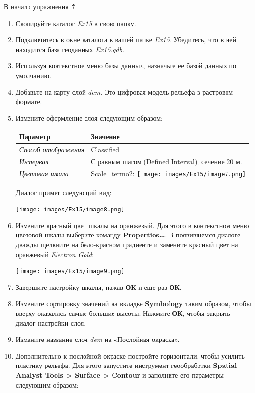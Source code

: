 \documentclass[12pt,]{book}
\begin{document}
\protect\hyperlink{dem}{В начало упражнения ⇡}

\begin{enumerate}
\def\labelenumi{\arabic{enumi}.}
\item
  Скопируйте каталог \emph{Ex15} в свою папку.
\item
  Подключитесь в окне каталога к вашей папке \emph{Ex15}. Убедитесь, что в ней находится база геоданных \emph{Ex15.gdb}.
\item
  Используя контекстное меню базы данных, назначьте ее базой данных по умолчанию.
\item
  Добавьте на карту слой \emph{dem}. Это цифровая модель рельефа в растровом формате.
\item
  Измените оформление слоя следующим образом:

  \begin{longtable}[]{@{}ll@{}}
  \toprule
  Параметр & Значение\tabularnewline
  \midrule
  \endhead
  \emph{Способ отображения} & Classified\tabularnewline
  \emph{Интервал} & С равным шагом (Defined Interval), сечение 20 м.\tabularnewline
  \emph{Цветовая шкала} & Scale\_termo2: \texttt{[image: images/Ex15/image7.png]}\tabularnewline
  \bottomrule
  \end{longtable}

  Диалог примет следующий вид:

  \texttt{[image: images/Ex15/image8.png]}
\item
  Измените красный цвет шкалы на оранжевый. Для этого в контекстном меню цветовой шкалы выберите команду \textbf{Properties\ldots{}}. В появившемся диалоге дважды щелкните на бело-красном градиенте и замените красный цвет на оранжевый \emph{Electron Gold}:

  \texttt{[image: images/Ex15/image9.png]}
\item
  Завершите настройку шкалы, нажав \textbf{ОК} и еще раз \textbf{ОК}.
\item
  Измените сортировку значений на вкладке \textbf{Symbology} таким образом, чтобы вверху оказались самые большие высоты. Нажмите \textbf{ОК}, чтобы закрыть диалог настройки слоя.
\item
  Измените название слоя \emph{dem} на «Послойная окраска».
\item
  Дополнительно к послойной окраске постройте горизонтали, чтобы усилить пластику рельефа. Для этого запустите инструмент геообработки \textbf{Spatial Analyst Tools \textgreater{} Surface \textgreater{} Contour} и заполните его параметры следующим образом:


\end{enumerate}
\end{document}
